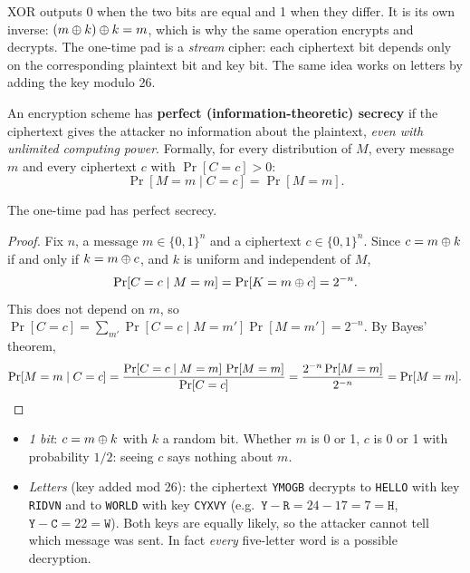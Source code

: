 XOR outputs 0 when the two bits are equal and 1 when they differ. It is its own inverse: $(m \oplus k) \oplus k = m$, which is why the same operation encrypts and decrypts. The one-time pad is a \emph{stream} cipher: each ciphertext bit depends only on the corresponding plaintext bit and key bit. The same idea works on letters by adding the key modulo 26.

\begin{definition}
An encryption scheme has \textbf{perfect (information-theoretic) secrecy} if the ciphertext gives the attacker no information about the plaintext, \emph{even with unlimited computing power}. Formally, for every distribution of $M$, every message $m$ and every ciphertext $c$ with $\Pr[C=c] > 0$:
\[
    \Pr[M = m \mid C = c] = \Pr[M = m].
\]
\end{definition}

\begin{theorem}
The one-time pad has perfect secrecy.
\end{theorem}
\begin{proof}
Fix $n$, a message $m \in \{0,1\}^n$ and a ciphertext $c \in \{0,1\}^n$. Since $c = m \oplus k$ if and only if $k = m \oplus c$, and $k$ is uniform and independent of $M$,
\[
    \Pr[C = c \mid M = m] = \Pr[K = m \oplus c] = 2^{-n}.
\]
This does not depend on $m$, so $\Pr[C=c] = \sum_{m'} \Pr[C=c \mid M=m']\Pr[M=m'] = 2^{-n}$. By Bayes' theorem,
\[
    \Pr[M=m \mid C=c] = \frac{\Pr[C=c \mid M=m]\,\Pr[M=m]}{\Pr[C=c]} = \frac{2^{-n}\Pr[M=m]}{2^{-n}} = \Pr[M=m]. \qedhere
\]
\end{proof}

\begin{example}
\leavevmode
\begin{itemize}
    \item \emph{1 bit}: $c = m \oplus k$ with $k$ a random bit. Whether $m$ is 0 or 1, $c$ is 0 or 1 with probability $1/2$: seeing $c$ says nothing about $m$.
    \item \emph{Letters} (key added mod 26): the ciphertext \texttt{YMOGB} decrypts to \texttt{HELLO} with key \texttt{RIDVN} and to \texttt{WORLD} with key \texttt{CYXVY} (e.g.\ $\texttt{Y}-\texttt{R} = 24-17 = 7 = \texttt{H}$, $\texttt{Y}-\texttt{C} = 22 = \texttt{W}$). Both keys are equally likely, so the attacker cannot tell which message was sent. In fact \emph{every} five-letter word is a possible decryption.
\end{itemize}
\end{example}

